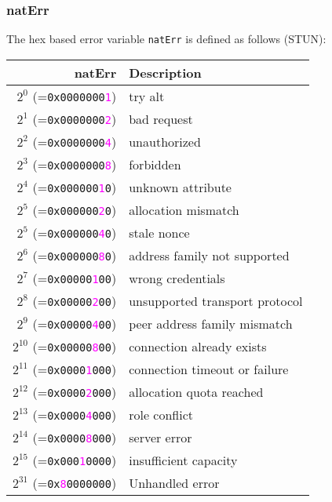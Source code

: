 \documentclass[documentation]{subfiles}
\begin{document}
\subsubsection{natErr}\label{natErr}
The hex based error variable {\tt natErr} is defined as follows (STUN):
\begin{longtable}{rl}
    \toprule
    {\bf natErr} & {\bf Description} \\
    \midrule\endhead%
    $2^{0}$  (={\tt 0x0000000\textcolor{magenta}{1}}) & try alt\\
    $2^{1}$  (={\tt 0x0000000\textcolor{magenta}{2}}) & bad request\\
    $2^{2}$  (={\tt 0x0000000\textcolor{magenta}{4}}) & unauthorized\\
    $2^{3}$  (={\tt 0x0000000\textcolor{magenta}{8}}) & forbidden\\
    $2^{4}$  (={\tt 0x000000\textcolor{magenta}{1}0}) & unknown attribute\\
    $2^{5}$  (={\tt 0x000000\textcolor{magenta}{2}0}) & allocation mismatch\\
    $2^{5}$  (={\tt 0x000000\textcolor{magenta}{4}0}) & stale nonce\\
    $2^{6}$  (={\tt 0x000000\textcolor{magenta}{8}0}) & address family not supported\\
    $2^{7}$  (={\tt 0x00000\textcolor{magenta}{1}00}) & wrong credentials\\
    $2^{8}$  (={\tt 0x00000\textcolor{magenta}{2}00}) & unsupported transport protocol\\
    $2^{9}$  (={\tt 0x00000\textcolor{magenta}{4}00}) & peer address family mismatch\\
    $2^{10}$ (={\tt 0x00000\textcolor{magenta}{8}00}) & connection already exists\\
    $2^{11}$ (={\tt 0x0000\textcolor{magenta}{1}000}) & connection timeout or failure\\
    $2^{12}$ (={\tt 0x0000\textcolor{magenta}{2}000}) & allocation quota reached\\
    $2^{13}$ (={\tt 0x0000\textcolor{magenta}{4}000}) & role conflict\\
    $2^{14}$ (={\tt 0x0000\textcolor{magenta}{8}000}) & server error\\
    $2^{15}$ (={\tt 0x000\textcolor{magenta}{1}0000}) & insufficient capacity\\
    $2^{31}$ (={\tt 0x\textcolor{magenta}{8}0000000}) & Unhandled error\\
    \bottomrule
\end{longtable}
\end{document}
